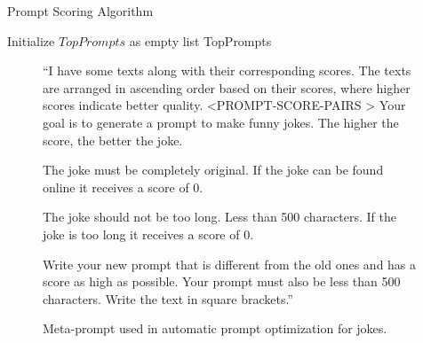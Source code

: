 \documentclass[phd,electronic,oneside,twosidetoc,letterpaper,chaptercenter,parttop,lof]{byumsphd}
\begin{document}
\begin{algorithm}[t]
\caption{Prompt Scoring Algorithm}
\label{alg:prompt-scoring}
\SetAlgoLined
\DontPrintSemicolon
Initialize $TopPrompts$ as empty list\;
\Return TopPrompts\;
\end{algorithm}

\begin{figure}[t]
    \begin{tcolorbox}[title=Prompt, colback=lightgray!10, colframe=black!75, fontupper=\small]
    ``I have some texts along with their corresponding scores. The texts are arranged in ascending order based on their scores, where higher scores indicate better quality.
    \newline\newline
    \textless PROMPT-SCORE-PAIRS \textgreater
    \newline\newline
    Your goal is to generate a prompt to make funny jokes. The higher the score, the better the joke. 
    
    The joke must be completely original. If the joke can be found online it receives a score of 0. 
    
    The joke should not be too long. Less than 500 characters. If the joke is too long it receives a score of 0.
    
    Write your new prompt that is different from the old ones and has a score as high as possible. Your prompt must also be less than 500 characters. Write the text in square brackets.''
    \end{tcolorbox}
\caption[Meta-prompt]{Meta-prompt used in automatic prompt optimization for  jokes.} 
\label{fig:metaprompt}
\end{figure}
\end{document}
